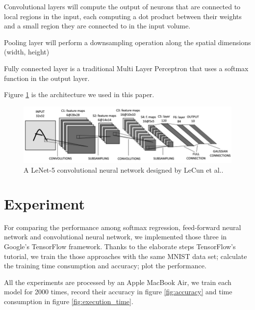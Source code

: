 \documentclass[article]{aaltoseries}
\begin{document}
Convolutional layers will compute the output of neurons that are connected to local regions in the input, 
each computing a dot product between their weights and a small region they are connected to in the input volume. 

Pooling layer will perform a downsampling operation along the spatial dimensions (width, height)

Fully connected layer is a traditional Multi Layer Perceptron that uses a softmax function in the output layer.

Figure \ref{fig:leNet} is the architecture we used in this paper.


\begin{figure}[t!]
  \begin{center}
    \includegraphics[width=1\textwidth]{figures/LeNet-5}
    \caption{A LeNet-5 convolutional neural network designed by LeCun et al.\cite{lecun1998gradient}.}
    \label{fig:leNet}
  \end{center}
\end{figure}

\section{Experiment}
\label{sec:experiment}

For comparing the performance among softmax regression, feed-forward neural network and convolutional neural network,
we implemented those three in Google's TensorFlow framework\cite{GoogleTensorFlow}.
Thanks to the elaborate steps TensorFlow's tutorial, we train the those approaches with the same MNIST data set\cite{lecun2010mnist};
calculate the training time consumption and accuracy; plot the performance.

All the experiments are processed by an Apple MacBook Air\cite{MacBookAir}, we train each model for 2000 times, record their accuracy
in figure \ref{fig:accuracy} and time consumption in figure \ref{fig:execution_time}. 
\end{document}
